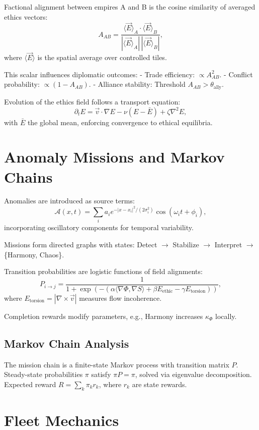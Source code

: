 \documentclass[12pt]{article}
\theoremstyle{definition}
\begin{document}
Factional alignment between empires A and B is the cosine similarity of averaged ethics vectors:
\[
A_{AB} = 
\frac{\langle \vec{E} \rangle_A \cdot \langle \vec{E} \rangle_B}
{|\langle \vec{E} \rangle_A| \, |\langle \vec{E} \rangle_B|},
\]
where $\langle \vec{E} \rangle$ is the spatial average over controlled tiles.

This scalar influences diplomatic outcomes:
- Trade efficiency: $\propto A_{AB}^2$.
- Conflict probability: $\propto (1 - A_{AB})$.
- Alliance stability: Threshold $A_{AB} > \theta_{\text{ally}}$.

Evolution of the ethics field follows a transport equation:
\[
\partial_t E = \vec{v} \cdot \nabla E - \nu (E - \bar{E}) + \zeta \nabla^2 E,
\]
with $\bar{E}$ the global mean, enforcing convergence to ethical equilibria.

\section{Anomaly Missions and Markov Chains}
Anomalies are introduced as source terms:
\[
\mathcal{A}(x,t) = \sum_i a_i e^{-|x - x_i|^2 / (2 \sigma_i^2)} \cos(\omega_i t + \phi_i),
\]
incorporating oscillatory components for temporal variability.

Missions form directed graphs with states: Detect $\to$ Stabilize $\to$ Interpret $\to$ \{Harmony, Chaos\}.

Transition probabilities are logistic functions of field alignments:
\[
P_{i \to j} = \frac{1}{1 + \exp(-(\alpha \langle \nabla \Phi, \nabla S \rangle + \beta E_{\text{ethic}} - \gamma E_{\text{torsion}}))},
\]
where $E_{\text{torsion}} = |\nabla \times \vec{v}|$ measures flow incoherence.

Completion rewards modify parameters, e.g., Harmony increases $\kappa_\Phi$ locally.

\subsection{Markov Chain Analysis}
The mission chain is a finite-state Markov process with transition matrix $P$. Steady-state probabilities $\pi$ satisfy $\pi P = \pi$, solved via eigenvalue decomposition. Expected reward $R = \sum_k \pi_k r_k$, where $r_k$ are state rewards.

\section{Fleet Mechanics}
\end{document}
